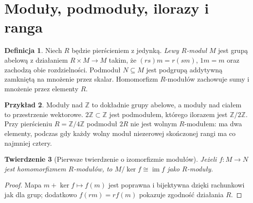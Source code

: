 \documentclass[11pt,a4paper,oneside]{report}
\newcommand{\Z}{\mathbb{Z}}
\theoremstyle{plain}
\newtheorem{twierdzenie}{Twierdzenie}[section]
\theoremstyle{definition}
\newtheorem{definicja}[twierdzenie]{Definicja}
\newtheorem{przyklad}[twierdzenie]{Przykład}
\theoremstyle{remark}
\begin{document}
\section{Moduły, podmoduły, ilorazy i ranga}
\begin{definicja}
Niech $R$ będzie pierścieniem z jedynką. \emph{Lewy $R$-moduł}
$M$ jest grupą abelową z działaniem $R\times M\to M$ takim,
że $(rs)m=r(sm)$, $1m=m$ oraz zachodzą obie rozdzielności.
Podmoduł $N\subseteq M$ jest podgrupą addytywną zamkniętą
na mnożenie przez skalar. Homomorfizm $R$-modułów zachowuje
sumy i mnożenie przez elementy $R$.
\end{definicja}
\begin{przyklad}
Moduły nad $\Z$ to dokładnie grupy abelowe, a moduły nad
ciałem to przestrzenie wektorowe. $2\Z\subset\Z$ jest
podmodułem, którego ilorazem jest $\Z/2\Z$.
Przy pierścieniu $R=\Z/4\Z$ podmoduł $2R$ nie jest wolnym
$R$-modułem: ma dwa elementy, podczas gdy każdy wolny
moduł niezerowej skończonej rangi ma co najmniej cztery.
\end{przyklad}
\begin{twierdzenie}[Pierwsze twierdzenie o izomorfizmie modułów]
Jeżeli $f:M\to N$ jest homomorfizmem $R$-modułów, to
$M/\ker f\cong\operatorname{im}f$ jako $R$-moduły.
\end{twierdzenie}
\begin{proof}
Mapa $m+\ker f\mapsto f(m)$ jest poprawna i bijektywna
dzięki rachunkowi jak dla grup; dodatkowo
$f(rm)=rf(m)$ pokazuje zgodność działania $R$.
\end{proof}
\end{document}
